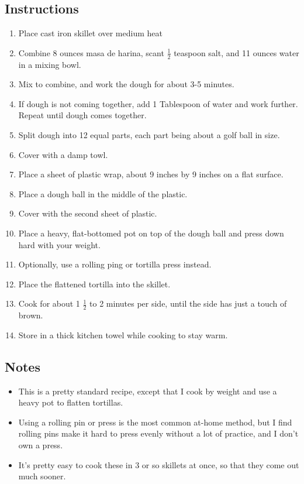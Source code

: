 \begin{multicols}{2}
\subsection*{Instructions}
\begin{enumerate}
    \item Place cast iron skillet over medium heat
    \item Combine 8 ounces masa de harina, scant \( \frac{1}{2} \) teaspoon salt, and 11 ounces water in a mixing bowl.
    \item Mix to combine, and work the dough for about 3-5 minutes.
    \item If dough is not coming together, add 1 Tablespoon of water and work further. Repeat until dough comes together.
    \item Split dough into 12 equal parts, each part being about a golf ball in size.
    \item Cover with a damp towl.
    \item Place a sheet of plastic wrap, about 9 inches by 9 inches on a flat surface.
    \item Place a dough ball in the middle of the plastic.
    \item Cover with the second sheet of plastic.
    \item Place a heavy, flat-bottomed pot on top of the dough ball and press down hard with your weight.
    \item Optionally, use a rolling ping or tortilla press instead.
    \item Place the flattened tortilla into the skillet.
    \item Cook for about 1 \( \frac{1}{2} \) to 2 minutes per side, until the side has just a touch of brown.
    \item Store in a thick kitchen towel while cooking to stay warm.
\end{enumerate}

\subsection*{Notes}
\begin{itemize}
    \item This is a pretty standard recipe, except that I cook by weight and use a heavy pot to flatten tortillas.
    \item Using a rolling pin or press is the most common at-home method, but I find rolling pins make it hard to press evenly without a lot of practice, and I don't own a press.
    \item It's pretty easy to cook these in 3 or so skillets at once, so that they come out much sooner.
\end{itemize}
\end{multicols}
\clearpage